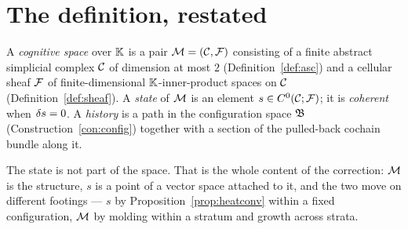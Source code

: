 \section{The definition, restated}

\begin{definition}\label{def:M}
A \emph{cognitive space} over $\mathbb{K}$ is a pair
$\mathcal{M}=(\mathcal{C},\mathcal{F})$ consisting of a finite abstract simplicial complex $\mathcal{C}$ of
dimension at most $2$ (Definition~\ref{def:asc}) and a cellular sheaf $\mathcal{F}$ of
finite-dimensional $\mathbb{K}$-inner-product spaces on $\mathcal{C}$
(Definition~\ref{def:sheaf}). A \emph{state} of $\mathcal{M}$ is an element
$s\in C^{0}(\mathcal{C};\mathcal{F})$; it is \emph{coherent} when $\delta s=0$. A \emph{history} is a
path in the configuration space $\mathfrak{B}$ (Construction~\ref{con:config})
together with a section of the pulled-back cochain bundle along it.
\end{definition}

The state is not part of the space. That is the whole content of the
correction: $\mathcal{M}$ is the structure, $s$ is a point of a vector space attached
to it, and the two move on different footings --- $s$ by
Proposition~\ref{prop:heatconv} within a fixed configuration, $\mathcal{M}$ by molding
within a stratum and growth across strata.

